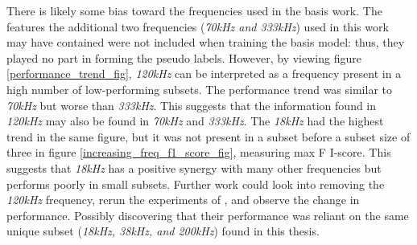     
    
    
    
    
    
    
    
    There is likely some bias toward the frequencies used in the basis work. The features the additional two frequencies (\textit{70kHz and 333kHz}) used in this work may have contained were not included when training the basis model: thus, they played no part in forming the pseudo labels.  However, by viewing figure \ref{performance_trend_fig}, \textit{120kHz} can be interpreted as a frequency present in a high number of low-performing subsets. The performance trend was similar to \textit{70kHz} but worse than \textit{333kHz}. This suggests that the information found in \textit{120kHz} may also be found in \textit{70kHz} and \textit{333kHz}. The \textit{18kHz} had the highest trend in the same figure, but it was not present in a subset before a subset size of three in figure \ref{increasing_freq_f1_score_fig}, measuring max F I-score. This suggests that \textit{18kHz} has a positive synergy with many other frequencies but performs poorly in small subsets. Further work could look into removing the \textit{120kHz} frequency, rerun the experiments of \citeauthor{brautaset2020acoustic}, and observe the change in performance. Possibly discovering that their performance was reliant on the same unique subset (\textit{18kHz, 38kHz, and 200kHz}) found in this thesis. 

